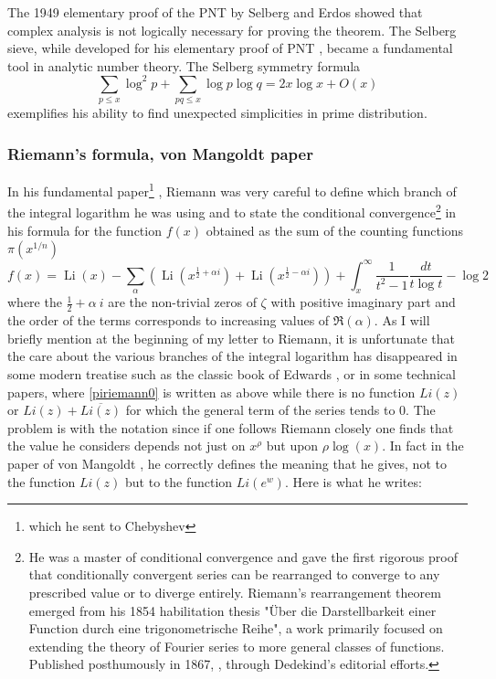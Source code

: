 \documentclass{article}
\begin{document}
      The 1949 elementary proof of the PNT by Selberg and Erdos showed that complex analysis is not logically necessary for proving the theorem.  The Selberg sieve, while developed for his elementary proof of PNT \cite{SelbergElementary}, became a fundamental tool in analytic number theory. The Selberg symmetry formula
    \[
   \sum_{p \leq x} \log ^2 p+\sum_{p q \leq x} \log p \log q=2 x \log x+O(x)
    \]
    exemplifies his ability to find unexpected simplicities in prime distribution.

  
    \subsubsection{Riemann's formula, von Mangoldt paper}\label{sectmangoldt}
    In his fundamental paper\footnote{which he sent to Chebyshev} \cite{Riemann}, Riemann was very careful to define which branch of the integral logarithm he was using and to state the conditional convergence\footnote{He was a master of conditional convergence and gave the first rigorous proof that conditionally convergent series can be rearranged to converge to any prescribed value or to diverge entirely. Riemann's rearrangement theorem emerged from his 1854 habilitation thesis "Über die Darstellbarkeit einer Function durch eine trigonometrische Reihe",  a work primarily focused on extending the theory of Fourier series to more general classes of functions. Published posthumously in 1867, \cite{Riemann1}, through Dedekind's editorial efforts.} in his formula for the function $f(x)$ obtained as the sum of the counting functions $\pi(x^{1/n})$
    \begin{equation}\label{piriemann0}
f(x)=\operatorname{Li}(x)-\sum_\alpha\left(\operatorname{Li}\left(x^{\frac{1}{2}+\alpha i}\right)+\operatorname{Li}\left(x^{\frac{1}{2}-\alpha i}\right)\right)+\int_x^{\infty} \frac{1}{t^2-1} \frac{d t}{t \log t}-\log 2
 \end{equation}
    where the $\frac{1}{2}+\alpha\ i$ are the non-trivial zeros of $\zeta$ with positive imaginary part and the order of the terms corresponds to increasing values of $\Re(\alpha)$.\newline
    As I will briefly mention at the beginning of my letter to Riemann, it is unfortunate that the care about the various branches of the integral logarithm has disappeared in some modern treatise such as the classic book of Edwards \cite{Edwards}, or in some technical papers, where \eqref{piriemann0} is written as above while there is no function $Li(z)$ or $Li(z)+\overline{Li(z)}$ for which the general term of the series tends to $0$. The problem is with the notation since if one follows Riemann closely one finds that the value he considers depends not just on $x^\rho$ but upon $\rho \log(x)$.      In fact in the paper of von Mangoldt \cite{vonMangoldt}, he correctly defines the meaning that he gives, not to the function $Li(z)$ but to the function $L i\left(e^w\right)$. Here is what he writes:\newline 
\end{document}
